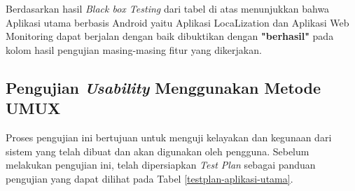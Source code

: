 \begin{table}[H]
\begin{tabular}{|c|l|l|l|l|}
	\end{tabular}
\end{table}

\par Berdasarkan hasil \textit{Black box Testing} dari tabel di atas menunjukkan bahwa Aplikasi utama berbasis Android yaitu Aplikasi LocaLization dan Aplikasi Web Monitoring dapat berjalan dengan baik dibuktikan dengan  \textbf{"berhasil"} pada kolom hasil pengujian masing-masing fitur yang dikerjakan.

\subsection{Pengujian \textit{Usability} Menggunakan Metode UMUX}
\par Proses pengujian ini bertujuan untuk menguji kelayakan dan kegunaan dari sistem yang telah dibuat dan akan digunakan oleh pengguna. Sebelum melakukan pengujian ini, telah dipersiapkan \textit{Test Plan} sebagai panduan pengujian yang dapat dilihat pada Tabel \ref{testplan-aplikasi-utama}.

